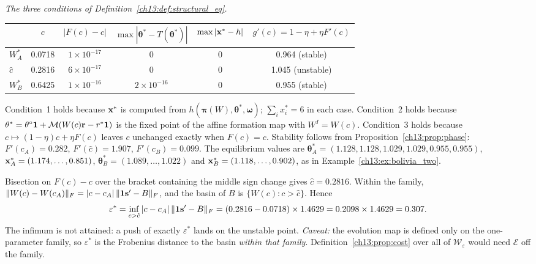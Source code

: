 \documentclass[../solutions_manual.tex]{subfiles}
\begin{document}
\emph{The three conditions of Definition~\ref{ch13:def:structural_eq}.}
\begin{center}
\small
\begin{tabular}{lccccc}
\toprule
& $c$ & $|F(c) - c|$ & $\max|\boldsymbol{\theta}^* - T(\boldsymbol{\theta}^*)|$ & $\max|\mathbf{x}^* - h|$ & $g'(c) = 1 - \eta + \eta F'(c)$ \\
\midrule
$W^*_A$ & 0.0718 & $1\times 10^{-17}$ & $0$ & $0$ & 0.964 (stable) \\
$\hat c$ & 0.2816 & $6\times 10^{-17}$ & $0$ & $0$ & 1.045 (unstable) \\
$W^*_B$ & 0.6425 & $1\times 10^{-16}$ & $2\times 10^{-16}$ & $0$ & 0.955 (stable) \\
\bottomrule
\end{tabular}
\end{center}
Condition~1 holds because $\mathbf{x}^*$ is computed from $h(\boldsymbol{\pi}(W), \boldsymbol{\theta}^*, \boldsymbol{\omega})$; $\sum_i x_i^* = 6$ in each case. Condition~2 holds because $\theta^* = \theta^{\circ}\mathbf{1} + \mathcal{M}(W(c)\mathbf{r} - r^*\mathbf{1})$ is the fixed point of the affine formation map with $W^I = W(c)$. Condition~3 holds because $c\mapsto(1-\eta)c + \eta F(c)$ leaves $c$ unchanged exactly when $F(c) = c$. Stability follows from Proposition~\ref{ch13:prop:phase}: $F'(c_A) = 0.282$, $F'(\hat c) = 1.907$, $F'(c_B) = 0.099$. The equilibrium values are $\boldsymbol{\theta}^*_A = (1.128, 1.128, 1.029, 1.029, 0.955, 0.955)$, $\mathbf{x}^*_A = (1.174, \ldots, 0.851)$, $\boldsymbol{\theta}^*_B = (1.089, \ldots, 1.022)$ and $\mathbf{x}^*_B = (1.118, \ldots, 0.902)$, as in Example~\ref{ch13:ex:bolivia_two}.

 Bisection on $F(c) - c$ over the bracket containing the middle sign change gives $\hat c = 0.2816$. Within the family, $\|W(c) - W(c_A)\|_F = |c - c_A|\,\|\mathbf{1}\mathbf{s}' - B\|_F$, and the basin of $B$ is $\{W(c): c > \hat c\}$. Hence
\[
\varepsilon^* = \inf_{c > \hat c}|c - c_A|\,\|\mathbf{1}\mathbf{s}' - B\|_F = (0.2816 - 0.0718)\times 1.4629 = 0.2098\times 1.4629 = 0.307 .
\]
The infimum is not attained: a push of exactly $\varepsilon^*$ lands on the unstable point. \textit{Caveat:} the evolution map is defined only on the one-parameter family, so $\varepsilon^*$ is the Frobenius distance to the basin \emph{within that family}. Definition~\ref{ch13:prop:cost} over all of $\mathcal{W}_\varepsilon$ would need $\mathcal{E}$ off the family.
\end{document}
